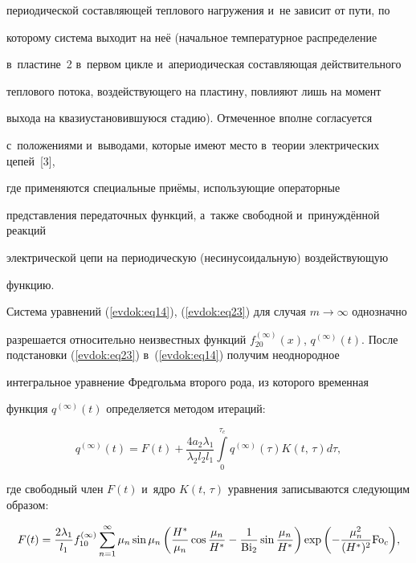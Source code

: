 периодической составляющей теплового нагружения и~не зависит от пути, по 

которому система выходит на неё (начальное температурное распределение 

в~пластине~2 в~первом цикле и~апериодическая составляющая действительного 

теплового потока, воздействующего на пластину, повлияют лишь на момент 

выхода на квазиустановившуюся стадию). Отмеченное вполне согласуется 

с~положениями и~выводами, которые имеют место в~теории электрических цепей~[3], 

где применяются специальные приёмы, использующие операторные 

представления передаточных функций, а~также свободной и~принуждённой реакций 

электрической цепи на периодическую (несинусоидальную) воздействующую 

функцию. 



Система уравнений (\ref{evdok:eq14}), (\ref{evdok:eq23}) для случая $m \to \infty $ однозначно 

разрешается относительно неизвестных функций $f_{20}^{(\infty )} 

(x)$, $q^{(\infty )}(t)$. После подстановки (\ref{evdok:eq23}) в~(\ref{evdok:eq14}) получим неоднородное 

интегральное уравнение Фредгольма второго рода, из которого временная 

функция $q^{(\infty )}(t)$ определяется методом итераций:

\begin{equation}

\label{evdok:eq24}

q^{(\infty )}(t) = F(t) + \frac{4a_2 \lambda _1 }{\lambda _2 l_2 l_1 

}\int\limits_0^{\tau _c } q^{(\infty )}(\tau )K(t,\,\tau )d\tau  ,

\end{equation}

где свободный член $F(t)$ и~ядро $K(t,\,\tau )$ уравнения записываются следующим образом:

\[

F(t) = \frac{2\lambda _1 }{l_1 }f_{10}^{(\infty )} \sum\limits_{n = 

1}^\infty {\mu _n \sin \mu _n \left( {\frac{H^\ast }{\mu _n }\cos \frac{\mu 

_n }{H^\ast } - \frac{1}{{\rm Bi}_2 }\sin \frac{\mu _n }{H^\ast }} \right)\exp 

\left( { - \frac{\mu _n^2 }{(H^\ast )^2}{\rm Fo}_c } \right)} ,

\]

